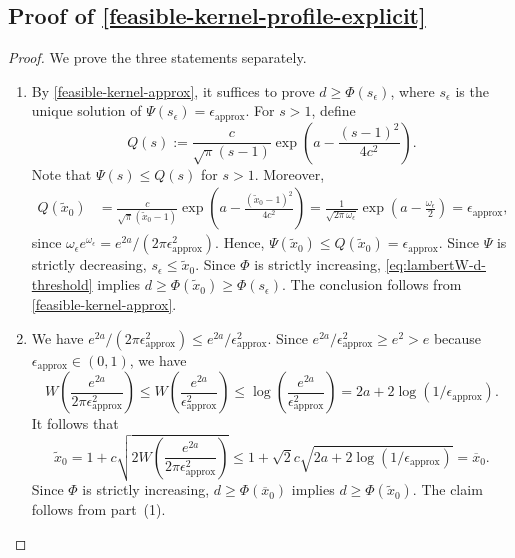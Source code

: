 \documentclass[10pt,reqno]{article}
\numberwithin{equation}{section}
\theoremstyle{plain}
\theoremstyle{definition}
\begin{document}
\subsection{Proof of \cref{feasible-kernel-profile-explicit}}\label{proof-of-feasible-kernel-profile-explicit}

\begin{proof}
We prove the three statements separately.
\begin{enumerate}
    \item By \cref{feasible-kernel-approx}, it suffices to prove \(d\geq \Phi(s_\epsilon)\), where \(s_\epsilon\) is the unique solution of \(\Psi(s_\epsilon)=\epsilon_{\operatorname{approx}}\). For \(s>1\), define
    \begin{equation}
    Q(s) := \frac{c}{\sqrt{\pi}(s-1)}\exp\left(a-\frac{(s-1)^2}{4c^2}\right).
    \end{equation}
    Note that \(\Psi(s)\le Q(s)\) for \(s>1\). Moreover,
    \begin{align}
    Q(\widetilde x_0) &= \frac{c}{\sqrt{\pi}(\widetilde x_0-1)}\exp\left(a-\frac{(\widetilde x_0-1)^2}{4c^2}\right) = \frac{1}{\sqrt{2\pi\,\omega_\epsilon}}\exp\left(a-\frac{\omega_\epsilon}{2}\right) = \epsilon_{\operatorname{approx}},
    \end{align}
    since \(\omega_\epsilon e^{\omega_\epsilon}=e^{2a}/(2\pi\epsilon_{\operatorname{approx}}^2)\). Hence, \(\Psi(\widetilde x_0)\leq Q(\widetilde x_0)=\epsilon_{\operatorname{approx}}\). Since \(\Psi\) is strictly decreasing, \(s_\epsilon\leq \widetilde x_0\). Since \(\Phi\) is strictly increasing, \cref{eq:lambertW-d-threshold} implies \(d\geq \Phi(\widetilde x_0)\geq \Phi(s_\epsilon)\). The conclusion follows from \cref{feasible-kernel-approx}.

    \item We have \(e^{2a}/(2\pi\epsilon_{\operatorname{approx}}^2)\le e^{2a}/\epsilon_{\operatorname{approx}}^2\). Since \(e^{2a}/\epsilon_{\operatorname{approx}}^2\ge e^2>e\) because \(\epsilon_{\operatorname{approx}}\in(0,1)\), we have
    \begin{equation}
    W\left(\frac{e^{2a}}{2\pi\epsilon_{\operatorname{approx}}^2}\right) \leq W\left(\frac{e^{2a}}{\epsilon_{\operatorname{approx}}^2}\right) \le \log\left(\frac{e^{2a}}{\epsilon_{\operatorname{approx}}^2}\right) = 2a+2\log(1/\epsilon_{\operatorname{approx}}).
    \end{equation}
    It follows that
    \begin{equation}
    \widetilde{x}_{0} = 1+c\sqrt{2W\left(\frac{e^{2a}}{2\pi\epsilon_{\operatorname{approx}}^2}\right)} \le 1+\sqrt{2}c\sqrt{2a+2\log(1/\epsilon_{\operatorname{approx}})} = \overline x_0.
    \end{equation}
    Since \(\Phi\) is strictly increasing, \(d\ge \Phi(\overline x_0)\) implies \(d\ge \Phi(\widetilde x_0)\). The claim follows from part~(1).


\end{enumerate}
\end{proof}
\end{document}
